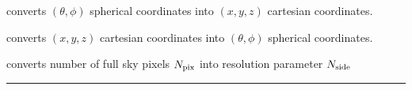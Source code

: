 \begin{related}
  \begin{sulist}{} %
  \item[\htmlref{ang2vec}{csub:ang2vec}] converts $(\theta,\phi)$ spherical coordinates into $(x,y,z)$ cartesian coordinates.
  \item[\htmlref{vec2ang}{csub:vec2ang}] converts $(x,y,z)$ cartesian coordinates into $(\theta,\phi)$ spherical coordinates.
  \item[\htmlref{nside2npix}{csub:nside2npix}] converts number of full sky pixels ${N_{\rm pix}}$ into resolution parameter ${N_{\rm side}}$
  \end{sulist}
\end{related}

\rule{\hsize}{2mm}

